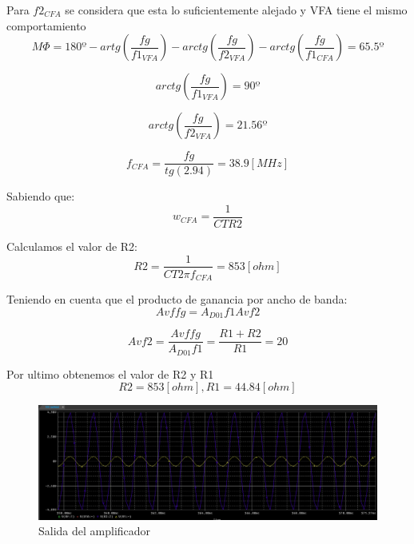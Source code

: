\documentclass[12pt]{article}
\begin{document}
	Para $f2_{CFA}$ se considera que esta lo suficientemente alejado y VFA tiene el mismo comportamiento
	\begin{equation}
			M\Phi =180º-artg\left( \frac{fg}{f1_{VFA}}\right) -arctg\left( \frac{fg}{f2_{VFA}}\right) -arctg\left( \frac{fg}{f1_{CFA}}\right)=65.5º
	\end{equation} 
	
	\begin{equation}
		arctg\left( \frac{fg}{f1_{VFA}}\right) =90º
	\end{equation}
	
	\begin{equation}
		arctg\left( \frac{fg}{f2_{VFA}}\right) =21.56º
	\end{equation}
	
	\begin{equation}
		f_{CFA}= \frac{fg}{tg(2.94)}=38.9[MHz]
	\end{equation}
	
	Sabiendo que:
	\begin{equation}
		w_{CFA}=\frac{1}{CTR2}
	\end{equation}
	
	Calculamos el valor de R2:
	\begin{equation}
		R2=\frac{1}{CT 2 \pi f_{CFA}}=853[ohm]
	\end{equation}
	
	Teniendo en cuenta que el producto de ganancia por ancho de banda:
	\begin{equation}
		Avf fg = A_{D01}f1Avf2
	\end{equation}
	
	\begin{equation}
		Avf2=\frac{Avf fg}{A_{D01}f1} = \frac{R1+R2}{R1}=20
	\end{equation}
	
	Por ultimo obtenemos el valor de R2 y R1
	\begin{equation}
		R2=853[ohm], R1=44.84[ohm]
	\end{equation}
	
	\begin{figure}[h!]
		\includegraphics[width=1\linewidth]{Simulaciones_Imagenes/1.B_Sim_gain}
		\caption[Salida del amplificador]{Salida del amplificador}
		\label{fig:5}
	\end{figure}
	
\end{document}
